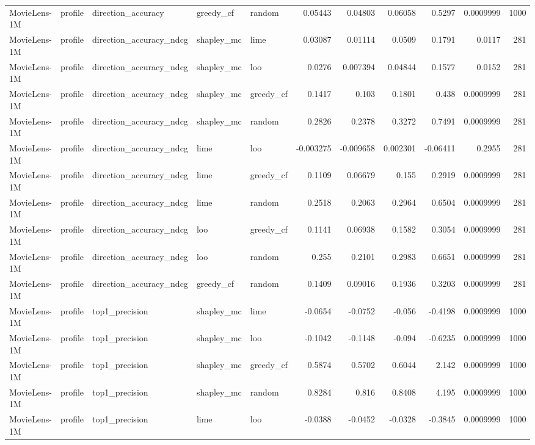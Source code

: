 \begin{table}[t]
\begin{tabular}{lllllrrrrrr}
MovieLens-1M & profile & direction\_accuracy & greedy\_cf & random & 0.05443 & 0.04803 & 0.06058 & 0.5297 & 0.0009999 & 1000 \\
MovieLens-1M & profile & direction\_accuracy\_ndcg & shapley\_mc & lime & 0.03087 & 0.01114 & 0.0509 & 0.1791 & 0.0117 & 281 \\
MovieLens-1M & profile & direction\_accuracy\_ndcg & shapley\_mc & loo & 0.0276 & 0.007394 & 0.04844 & 0.1577 & 0.0152 & 281 \\
MovieLens-1M & profile & direction\_accuracy\_ndcg & shapley\_mc & greedy\_cf & 0.1417 & 0.103 & 0.1801 & 0.438 & 0.0009999 & 281 \\
MovieLens-1M & profile & direction\_accuracy\_ndcg & shapley\_mc & random & 0.2826 & 0.2378 & 0.3272 & 0.7491 & 0.0009999 & 281 \\
MovieLens-1M & profile & direction\_accuracy\_ndcg & lime & loo & -0.003275 & -0.009658 & 0.002301 & -0.06411 & 0.2955 & 281 \\
MovieLens-1M & profile & direction\_accuracy\_ndcg & lime & greedy\_cf & 0.1109 & 0.06679 & 0.155 & 0.2919 & 0.0009999 & 281 \\
MovieLens-1M & profile & direction\_accuracy\_ndcg & lime & random & 0.2518 & 0.2063 & 0.2964 & 0.6504 & 0.0009999 & 281 \\
MovieLens-1M & profile & direction\_accuracy\_ndcg & loo & greedy\_cf & 0.1141 & 0.06938 & 0.1582 & 0.3054 & 0.0009999 & 281 \\
MovieLens-1M & profile & direction\_accuracy\_ndcg & loo & random & 0.255 & 0.2101 & 0.2983 & 0.6651 & 0.0009999 & 281 \\
MovieLens-1M & profile & direction\_accuracy\_ndcg & greedy\_cf & random & 0.1409 & 0.09016 & 0.1936 & 0.3203 & 0.0009999 & 281 \\
MovieLens-1M & profile & top1\_precision & shapley\_mc & lime & -0.0654 & -0.0752 & -0.056 & -0.4198 & 0.0009999 & 1000 \\
MovieLens-1M & profile & top1\_precision & shapley\_mc & loo & -0.1042 & -0.1148 & -0.094 & -0.6235 & 0.0009999 & 1000 \\
MovieLens-1M & profile & top1\_precision & shapley\_mc & greedy\_cf & 0.5874 & 0.5702 & 0.6044 & 2.142 & 0.0009999 & 1000 \\
MovieLens-1M & profile & top1\_precision & shapley\_mc & random & 0.8284 & 0.816 & 0.8408 & 4.195 & 0.0009999 & 1000 \\
MovieLens-1M & profile & top1\_precision & lime & loo & -0.0388 & -0.0452 & -0.0328 & -0.3845 & 0.0009999 & 1000 \\

\end{tabular}
\end{table}
